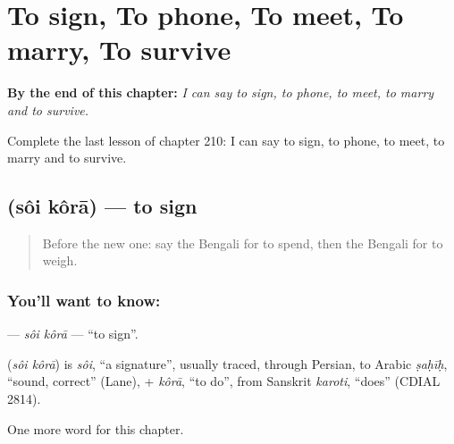 
\chapter{To sign, To phone, To meet, To marry, To survive}
\label{ch:bn-to-sign-to-phone-to-meet-to-marry-to-survive}

\begin{chapteropening}
\textbf{By the end of this chapter:} \emph{I can say to sign, to phone, to meet, to marry and to survive.}

Complete the last lesson of chapter 210: I can say to sign, to phone, to meet, to marry and to survive.
\end{chapteropening}

\section[\texorpdfstring{\bn{সই} \bn{করা} (sôi kôrā)}{সই করা (sôi kôrā)}]{  (sôi kôrā) — to sign}

\label{lesson:BN-C210-soi-kora}



\begin{quote}
Before the new one: say the Bengali for to spend, then the Bengali for to weigh.
\end{quote}

\subsection*{You'll want to know:  }
\textbf{ } — \emph{sôi kôrā} — \textquotedblleft{}to sign\textquotedblright{}.

\begin{cousinweb}
\textbf{ } (\emph{sôi kôrā}) is \emph{sôi}, \textquotedblleft{}a signature\textquotedblright{}, usually traced, through Persian, to Arabic \emph{ṣaḥīḥ}, \textquotedblleft{}sound, correct\textquotedblright{} (Lane), + \emph{kôrā}, \textquotedblleft{}to do\textquotedblright{}, from Sanskrit \emph{karoti}, \textquotedblleft{}does\textquotedblright{} (CDIAL 2814).
\end{cousinweb}

\begin{grammarlens}[title={What you've built}]
One more word for this chapter.
\end{grammarlens}

